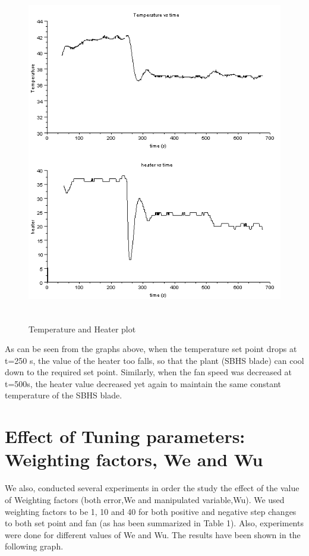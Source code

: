 \begin{figure}[H]
  \includegraphics[width=12cm, height=15cm]{mpc/2_1_heater_final.png}
  \caption{Temperature and Heater plot}
\end{figure}
As can be seen from the graphs above, when the temperature set point drops at t=250 s, the value of the heater too falls, so that the plant (SBHS blade) can cool down to the required set point. Similarly, when the fan speed was decreased at t=500s, the heater value decreased yet again to maintain the same constant temperature of the SBHS blade.


\section{Effect of Tuning parameters: Weighting factors, We and Wu}
We also, conducted several experiments in order the study the effect of the value of Weighting factors (both error,We and manipulated variable,Wu). We used weighting factors to be 1, 10 and 40 for both positive and negative step changes to both set point and fan (as has been summarized in Table 1). Also, experiments were done for different values of We and Wu. The results have been shown in the following graph. 
